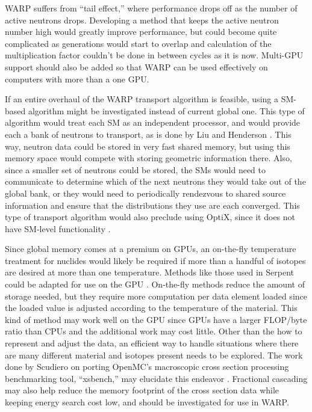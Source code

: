 \documentclass[preprint,12pt]{elsarticle}
\begin{document}
WARP suffers from ``tail effect,'' where performance drops off as the number of active neutrons drops.  Developing a method that keeps the active neutron number high would greatly improve performance, but could become quite complicated as generations would start to overlap and calculation of the multiplication factor couldn't be done in between cycles  as it is now.  Multi-GPU support should also be added so that WARP can be used effectively on computers with more than a one GPU.

If an entire overhaul of the WARP transport algorithm is feasible, using a SM-based algorithm might be investigated instead of current global one.  This type of algorithm would treat each SM as an independent processor, and would provide each a bank of neutrons to transport, as is done by Liu and Henderson \cite{tianyu,henderson}.   This way, neutron data could be stored in very fast shared memory, but using this memory space would compete with storing geometric information there.  Also, since a smaller set of neutrons could be stored, the SMs would need to communicate to determine which of the next neutrons they would take out of the global bank, or they would need to periodically rendezvous to shared source information and ensure that the distributions they use are each converged.  This type of transport algorithm would also preclude using OptiX, since it does not have SM-level functionality \cite{optix}.

Since global memory comes at a premium on GPUs, an on-the-fly temperature treatment for nuclides would likely be required if more than a handful of isotopes are desired at more than one temperature.  Methods like those used in Serpent could be adapted for use on the GPU \cite{serpent}.  On-the-fly methods reduce the amount of storage needed, but they require more computation per data element loaded since the loaded value is adjusted according to the temperature of the material.  This kind of method may work well on the GPU since GPUs have a larger FLOP/byte ratio than CPUs and the additional work may cost little.  Other than the how to represent and adjust the data, an efficient way to handle situations where there are many different material and isotopes present needs to be explored.  The work done by Scudiero on porting OpenMC's macroscopic cross section processing benchmarking tool, ``xsbench,'' may elucidate this endeavor \cite{openmc,scudiero}.   Fractional cascading may also help reduce the memory footprint of the cross section data while keeping energy search cost low, and should be investigated for use in WARP\cite{FC_lund}.
\end{document}
